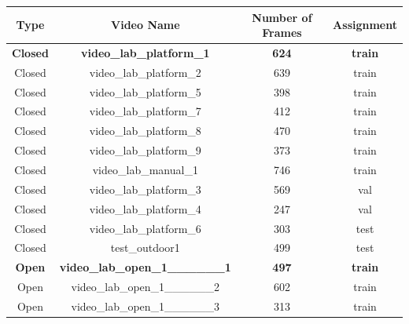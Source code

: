 \documentclass[12pt,oneside]{book} %
\begin{document}
\begin{table}[H]
    \centering
    \begin{tabular}{@{}cccc@{}}
        \toprule
        \textbf{Type}      & \textbf{Video Name}                           & \textbf{Number of Frames} & \textbf{Assignment} \\ \midrule
        \textbf{Closed}    & \textbf{video\_lab\_platform\_1}              & \textbf{624}              & \textbf{train}      \\
        Closed             & video\_lab\_platform\_2                       & 639                       & train               \\
        Closed             & video\_lab\_platform\_5                       & 398                       & train               \\
        Closed             & video\_lab\_platform\_7                       & 412                       & train               \\
        Closed             & video\_lab\_platform\_8                       & 470                       & train               \\
        Closed             & video\_lab\_platform\_9                       & 373                       & train               \\
        Closed             & video\_lab\_manual\_1                         & 746                       & train               \\
        Closed             & video\_lab\_platform\_3                       & 569                       & val                 \\
        Closed             & video\_lab\_platform\_4                       & 247                       & val                 \\
        Closed             & video\_lab\_platform\_6                       & 303                       & test                \\
        Closed             & test\_outdoor1                                & 499                       & test                \\
        \textbf{Open}      & \textbf{video\_lab\_open\_1\_\_\_\_\_\_1}     & \textbf{497}              & \textbf{train}      \\
        Open               & video\_lab\_open\_1\_\_\_\_\_\_2              & 602                       & train               \\
        Open               & video\_lab\_open\_1\_\_\_\_\_\_3              & 313                       & train               \\

\end{tabular}
\end{table}
\end{document}
